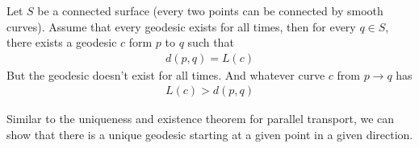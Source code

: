 \documentclass[10pt]{article}
\begin{document}
            \begin{theorem}
                Let $S$ be a connected surface (every two points can be connected by smooth curves). Assume that every geodesic exists for all times, then for every $q\in S$, there exists a geodesic $c$ form $p$ to $q$ such that 
                \begin{equation*}
                    \begin{aligned}
                        d(p, q) = L(c)
                    \end{aligned}
                \end{equation*}
                But the geodesic doesn't exist for all times. And whatever curve $c$ from $p\to q$ has
                \begin{equation*}
                    \begin{aligned}
                        L(c) > d(p, q)
                    \end{aligned}
                \end{equation*}
            \end{theorem}

            Similar to the uniqueness and existence theorem for parallel transport, we can show that there is a unique geodesic starting at a given point in a given direction.
\end{document}
